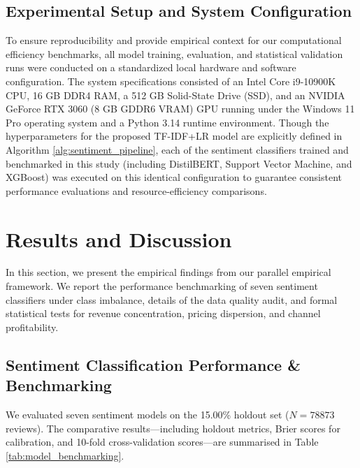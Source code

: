 \documentclass[authoryear,review,3p,times,12pt]{elsarticle}
\begin{document}
\subsection{Experimental Setup and System Configuration}
To ensure reproducibility and provide empirical context for our computational efficiency benchmarks, all model training, evaluation, and statistical validation runs were conducted on a standardized local hardware and software configuration. The system specifications consisted of an Intel Core i9-10900K CPU, 16 GB DDR4 RAM, a 512 GB Solid-State Drive (SSD), and an NVIDIA GeForce RTX 3060 (8 GB GDDR6 VRAM) GPU running under the Windows 11 Pro operating system and a Python 3.14 runtime environment. Though the hyperparameters for the proposed TF-IDF+LR model are explicitly defined in Algorithm \ref{alg:sentiment_pipeline}, each of the sentiment classifiers trained and benchmarked in this study (including DistilBERT, Support Vector Machine, and XGBoost) was executed on this identical configuration to guarantee consistent performance evaluations and resource-efficiency comparisons.

\section{Results and Discussion}
\label{sec:results}
In this section, we present the empirical findings from our parallel empirical framework. We report the performance benchmarking of seven sentiment classifiers under class imbalance, details of the data quality audit, and formal statistical tests for revenue concentration, pricing dispersion, and channel profitability.

\subsection{Sentiment Classification Performance \& Benchmarking}
We evaluated seven sentiment models on the 15.00\% holdout set ($N = 78873$ reviews). The comparative results—including holdout metrics, Brier scores for calibration, and 10-fold cross-validation scores—are summarised in Table \ref{tab:model_benchmarking}.
\end{document}
